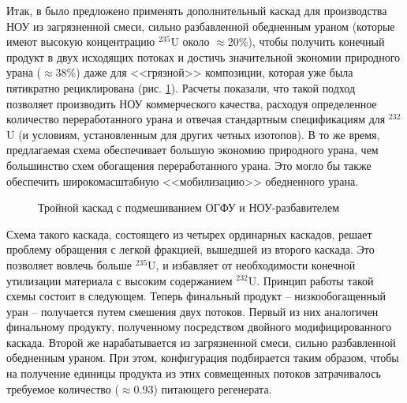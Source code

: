 Итак, в \cite{smirnovMethodEnrichReprocessed2019}  было предложено применять дополнительный каскад для производства НОУ из загрязненной смеси, сильно разбавленной обедненным ураном (которые имеют высокую концентрацию $^{235}$U около $\approx$20\%), чтобы получить конечный продукт в двух исходящих потоках и достичь значительной экономии природного урана ($\approx$38\%) даже для <<грязной>> композиции, которая уже была пятикратно рециклирована (рис. \ref{fig:Tomsk}). Расчеты показали, что такой подход позволяет производить НОУ коммерческого качества, расходуя определенное количество переработанного урана и отвечая стандартным спецификациям для  $^{232}$U (и условиям, установленным для других четных изотопов). В то же время, предлагаемая схема обеспечивает большую экономию природного урана, чем большинство схем обогащения переработанного урана. Это могло бы также обеспечить широкомасштабную <<мобилизацию>> обедненного урана.

\begin{figure}[ht]
  \caption{Тройной каскад с подмешиванием ОГФУ и НОУ-разбавителем}\label{fig:Tomsk}
\end{figure}

Схема такого каскада, состоящего из четырех ординарных каскадов, решает проблему обращения с легкой фракцией, вышедшей из второго каскада.
Это позволяет вовлечь больше $^{235}$U, и избавляет от необходимости конечной утилизации материала с высоким содержанием $^{232}$U.
Принцип работы такой схемы состоит в следующем.
Теперь финальный продукт -- низкообогащенный уран -- получается путем смешения двух потоков.
Первый из них аналогичен финальному продукту, полученному посредством двойного модифицированного каскада.
Второй же нарабатывается из загрязненной смеси, сильно разбавленной обедненным ураном.
При этом, конфигурация подбирается таким образом, чтобы на получение единицы продукта из этих совмещенных потоков затрачивалось требуемое количество ($\approx$0.93) питающего регенерата.

